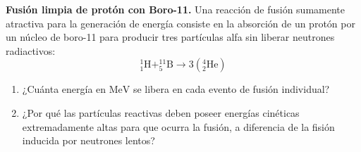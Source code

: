 \item \textbf{Fusión limpia de protón con Boro-11.}
Una reacción de fusión sumamente atractiva para la generación de energía consiste en la absorción de un protón por un núcleo de boro-11 para producir tres partículas alfa sin liberar neutrones radiactivos:
$$ ^{1}_{1}\text{H} + ^{11}_{5}\text{B} \to 3(^{4}_{2}\text{He}) $$
\begin{enumerate}
    \item ¿Cuánta energía en $\text{MeV}$ se libera en cada evento de fusión individual?
    \item ¿Por qué las partículas reactivas deben poseer energías cinéticas extremadamente altas para que ocurra la fusión, a diferencia de la fisión inducida por neutrones lentos?
\end{enumerate}